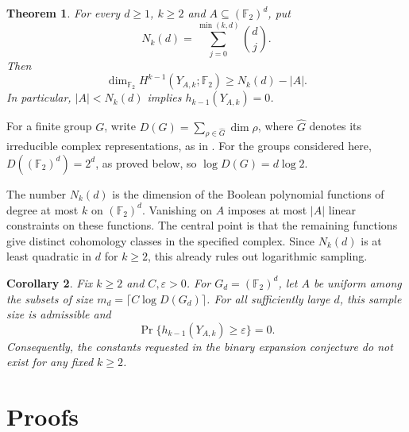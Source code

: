 \documentclass[11pt]{article}
\newtheorem{theorem}{Theorem}
\newtheorem{corollary}[theorem]{Corollary}
\newcommand{\F}{\mathbb F_2}
\begin{document}
\begin{theorem}\label{thm:obstruction}
For every $d\ge1$, $k\ge2$ and $A\subseteq(\F)^d$, put
\[
N_k(d)=\sum_{j=0}^{\min(k,d)}\binom dj.
\]
Then
\begin{equation}\label{eq:dimension}
\dim_{\F}H^{k-1}(Y_{A,k};\F)\ge N_k(d)-|A|.
\end{equation}
In particular, $|A|<N_k(d)$ implies $h_{k-1}(Y_{A,k})=0$.
\end{theorem}

For a finite group $G$, write
$D(G)=\sum_{\rho\in\widehat G}\dim\rho$, where $\widehat G$ denotes its
irreducible complex representations, as in \cite{meshulam}.
For the groups considered here, $D((\F)^d)=2^d$, as proved below,
so $\log D(G)=d\log2$.

The number $N_k(d)$ is the dimension of the Boolean polynomial functions
of degree at most $k$ on $(\F)^d$. Vanishing on $A$ imposes at most $|A|$
linear constraints on these functions. The central point is that the
remaining functions give distinct cohomology classes in the specified
complex. Since $N_k(d)$ is at least quadratic in $d$ for $k\ge2$, this
already rules out logarithmic sampling.

\begin{corollary}\label{cor:logarithmic}
Fix $k\ge2$ and $C,\varepsilon>0$. For $G_d=(\F)^d$, let $A$ be uniform
among the subsets of size $m_d=\lceil C\log D(G_d)\rceil$.
For all sufficiently large $d$, this sample size is admissible and
\[
\Pr\{h_{k-1}(Y_{A,k})\ge\varepsilon\}=0.
\]
Consequently, the constants requested in the binary expansion conjecture
do not exist for any fixed $k\ge2$.
\end{corollary}

\section{Proofs}
\end{document}
